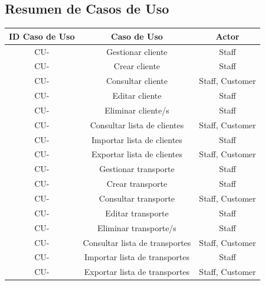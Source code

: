 \documentclass{article}
\begin{document}
    \subsection{Resumen de Casos de Uso}
    \newcommand\rownumber{\stepcounter{magicrownumbers}\arabic{magicrownumbers}}
    \begin{center}
        \begin{longtable}{ |c|c|c| }
            \hline

            \rowcolor{lightgray}
            ID Caso de Uso & Caso de Uso & Actor \\
            \endhead

            \hline
            \endfoot

            \hline
            CU-\rownumber & Gestionar cliente & Staff \\
            CU-\rownumber & Crear cliente & Staff \\
            CU-\rownumber & Consultar cliente & Staff, Customer \\
            CU-\rownumber & Editar cliente & Staff \\
            CU-\rownumber & Eliminar cliente/s & Staff \\
            CU-\rownumber & Consultar lista de clientes & Staff, Customer \\
            CU-\rownumber & Importar lista de clientes & Staff \\
            CU-\rownumber & Exportar lista de clientes & Staff, Customer \\

            CU-\rownumber & Gestionar transporte & Staff \\
            CU-\rownumber & Crear transporte & Staff \\
            CU-\rownumber & Consultar transporte & Staff, Customer \\
            CU-\rownumber & Editar transporte & Staff \\
            CU-\rownumber & Eliminar transporte/s & Staff \\
            CU-\rownumber & Consultar lista de transportes & Staff, Customer \\
            CU-\rownumber & Importar lista de transportes & Staff \\
            CU-\rownumber & Exportar lista de transportes & Staff, Customer \\


\end{longtable}
\end{center}
\end{document}

